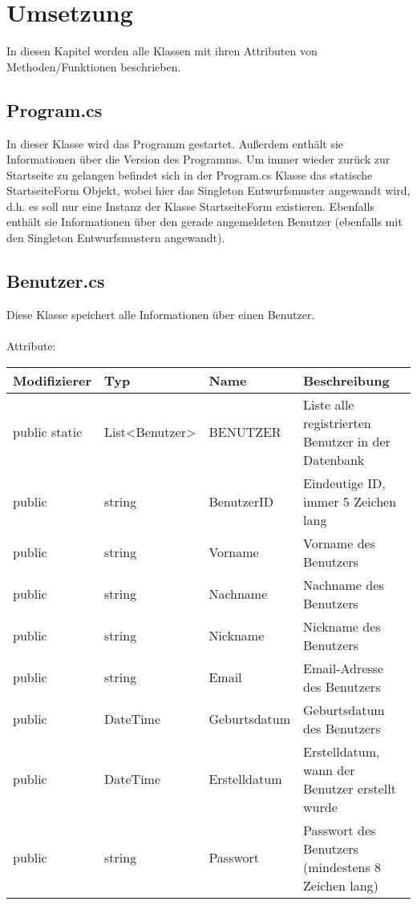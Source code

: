 \chapter{Umsetzung}

In diesen Kapitel werden alle Klassen mit ihren Attributen von Methoden/Funktionen beschrieben.

\section{Program.cs}
In dieser Klasse wird das Programm gestartet. Außerdem enthält sie Informationen über die Version des Programms. Um immer wieder zurück zur Startseite zu gelangen befindet sich in der Program.cs Klasse das statische StartseiteForm Objekt, wobei hier das Singleton Entwurfsmuster angewandt wird, d.h. es soll nur eine Instanz der Klasse StartseiteForm existieren. Ebenfalls enthält sie Informationen über den gerade angemeldeten Benutzer (ebenfalls mit den Singleton Entwurfsmustern angewandt).

\section{Benutzer.cs}

Diese Klasse speichert alle Informationen über einen Benutzer.\\
\\
Attribute:\\

\begin{tabular}[h]{l|l|l|p{8cm}}
Modifizierer & Typ & Name & Beschreibung\\
\hline
public static & List<Benutzer> & BENUTZER & Liste alle registrierten Benutzer in der Datenbank\\
\hline
public & string & BenutzerID & Eindeutige ID, immer 5 Zeichen lang\\
\hline
public & string & Vorname & Vorname des Benutzers\\
\hline
public & string & Nachname & Nachname des Benutzers\\
\hline
public & string & Nickname & Nickname des Benutzers\\
\hline
public & string & Email & Email-Adresse des Benutzers\\
\hline
public & DateTime & Geburtsdatum & Geburtsdatum des Benutzers\\
\hline
public & DateTime & Erstelldatum & Erstelldatum, wann der Benutzer erstellt wurde\\
\hline
public & string & Passwort & Passwort des Benutzers (mindestens 8 Zeichen lang)\\
\end{tabular}

